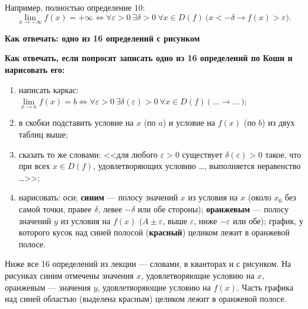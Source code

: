 \documentclass[a4paper,11pt]{article}
\newcommand{\eps}{\varepsilon}
\newcommand{\podr}[1]{\par\needspace{8\baselineskip}\medskip
  {\large\bfseries\textcolor{oprc!80!black}{#1}}\par\nopagebreak\smallskip}
\begin{document}
Например, полностью определение 10:
\[
  \lim_{x \to -\infty} f(x) = +\infty \Leftrightarrow \forall \eps > 0\ \exists \delta > 0\ \forall x \in D(f)\ \bigl(x < -\delta \to f(x) > \eps\bigr).
\]


\podr{Как отвечать: одно из 16 определений с рисунком}

\begin{planbox}
\textbf{Как отвечать, если попросят записать одно из 16 определений по Коши и нарисовать его:}
\begin{enumerate}[nosep,leftmargin=*,label=\arabic*)]
  \item написать каркас: $\lim\limits_{x \to a} f(x) = b \Leftrightarrow \forall \eps > 0\ \exists \delta(\eps) > 0\ \forall x \in D(f)\ \bigl(\ \dots \to \dots\ \bigr)$;
  \item в скобки подставить условие на $x$ (по $a$) и условие на $f(x)$ (по $b$) из двух таблиц выше;
  \item сказать то же словами: <<для любого $\eps > 0$ существует $\delta(\eps) > 0$ такое, что при всех $x \in D(f)$,
        удовлетворяющих условию \dots, выполняется неравенство \dots>>;
  \item нарисовать: оси; \textcolor{blue!70!black}{\textbf{синим}} --- полосу значений $x$ из условия на $x$
        (около $x_0$ без самой точки, правее $\delta$, левее $-\delta$ или обе стороны);
        \textcolor{orange!90!black}{\textbf{оранжевым}} --- полосу значений $y$ из условия на $f(x)$
        ($A \pm \eps$, выше $\eps$, ниже $-\eps$ или обе); график, у которого кусок над синей полосой
        (\textcolor{red!80!black}{\textbf{красный}}) целиком лежит в оранжевой полосе.
\end{enumerate}
\end{planbox}

Ниже все 16 определений из лекции --- словами, в кванторах и с рисунком. На рисунках синим отмечены значения $x$,
удовлетворяющие условию на $x$, оранжевым --- значения $y$, удовлетворяющие условию на $f(x)$. Часть графика над синей
областью (выделена красным) целиком лежит в оранжевой полосе.

\par{}\medskip\noindent{\bfseries\textcolor{oprc!80!black}{Предел при $x \to x_0$}}\par\smallskip
\end{document}
